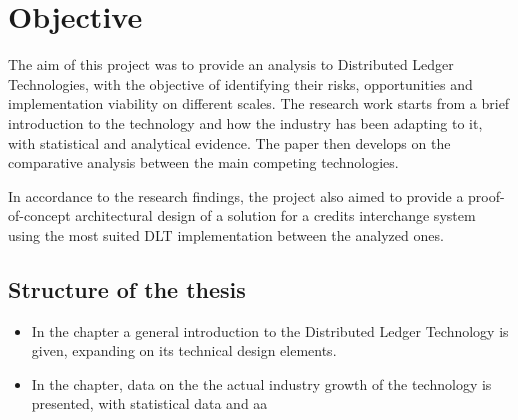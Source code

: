 
\newpage

\mbox{}\vfill
\chapter*{\centering Objective}

The aim of this project was to provide an analysis to Distributed Ledger Technologies, with the objective of identifying their risks, opportunities and implementation viability on different scales. The research work starts from a brief introduction to the technology and how the industry has been adapting to it, with statistical and analytical evidence. The paper then develops on the comparative analysis between the main competing technologies.

In accordance to the research findings, the project also aimed to provide a proof-of-concept architectural design of a solution for a credits interchange system using the most suited DLT implementation between the analyzed ones.

\section*{Structure of the thesis}

\begin{itemize}

    \item In the  chapter a general introduction to the Distributed Ledger Technology is given, expanding on its technical design elements.

    \item In the  chapter, data on the the actual industry growth of the technology is presented, with statistical data and aa

\end{itemize}

\mbox{}\vfill
